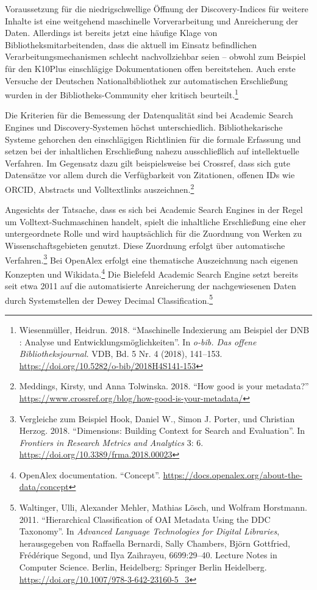 \documentclass[a4paper,
fontsize=11pt,
oneside,
numbers=noperiodatend,
parskip=half-,
bibliography=totoc,
final
]{scrartcl}
\begin{document}
Voraussetzung für die niedrigschwellige Öffnung der Discovery-Indices
für weitere Inhalte ist eine weitgehend maschinelle Vorverarbeitung und
Anreicherung der Daten. Allerdings ist bereits jetzt eine häufige Klage
von Bibliotheksmitarbeitenden, dass die aktuell im Einsatz befindlichen
Verarbeitungsmechanismen schlecht nachvollziehbar seien -- obwohl zum
Beispiel für den K10Plus einschlägige Dokumentationen offen
bereitstehen. Auch erste Versuche der Deutschen Nationalbibliothek zur
automatischen Erschließung wurden in der Bibliotheks-Community eher
kritisch beurteilt.\footnote{Wiesenmüller, Heidrun. 2018.
  \enquote{Maschinelle Indexierung am Beispiel der DNB : Analyse und
  Entwicklungsmöglichkeiten}. In \emph{o-bib. Das offene
  Bibliotheksjournal.} VDB, Bd. 5 Nr. 4 (2018), 141--153.
  \url{https://doi.org/10.5282/o-bib/2018H4S141-153}}

Die Kriterien für die Bemessung der Datenqualität sind bei Academic
Search Engines und Disco\-very-Systemen höchst unterschiedlich.
Bibliothekarische Systeme gehorchen den einschlägigen Richtlinien für
die formale Erfassung und setzen bei der inhaltlichen Erschließung
nahezu ausschließlich auf intellektuelle Verfahren. Im Gegensatz dazu
gilt beispielsweise bei Crossref, dass sich gute Datensätze vor allem
durch die Verfügbarkeit von Zitationen, offenen IDs wie ORCID, Abstracts
und Volltextlinks auszeichnen.\footnote{Meddings, Kirsty, und Anna
  Tolwinska. 2018. \enquote{How good is your metadata?}
  \url{https://www.crossref.org/blog/how-good-is-your-metadata/}}

Angesichts der Tatsache, dass es sich bei Academic Search Engines in der
Regel um Volltext-Suchmaschinen handelt, spielt die inhaltliche
Erschließung eine eher untergeordnete Rolle und wird hauptsächlich für
die Zuordnung von Werken zu Wissenschaftsgebieten genutzt. Diese
Zuordnung erfolgt über automatische Verfahren.\footnote{Vergleiche zum
  Beispiel Hook, Daniel W., Simon J. Porter, und Christian Herzog. 2018.
  \enquote{Dimensions: Building Context for Search and Evaluation}. In
  \emph{Frontiers in Research Metrics and Analytics} 3: 6.
  \url{https://doi.org/10.3389/frma.2018.00023}} Bei OpenAlex erfolgt
eine thematische Auszeichnung nach eigenen Konzepten und
Wikidata.\footnote{OpenAlex documentation. \enquote{Concept}.
  \url{https://docs.openalex.org/about-the-data/concept}} Die Bielefeld
Academic Search Engine setzt bereits seit etwa 2011 auf die
automatisierte Anreicherung der nachgewiesenen Daten durch Systemstellen
der Dewey Decimal Classification.\footnote{Waltinger, Ulli, Alexander
  Mehler, Mathias Lösch, und Wolfram Horstmann. 2011.
  \enquote{Hierarchical Classification of OAI Metadata Using the DDC
  Taxonomy}. In \emph{Advanced Language Technologies for Digital
  Libraries}, herausgegeben von Raffaella Bernardi, Sally Chambers,
  Björn Gottfried, Frédérique Segond, und Ilya Zaihrayeu, 6699:29--40.
  Lecture Notes in Computer Science. Berlin, Heidelberg: Springer Berlin
  Heidelberg. \url{https://doi.org/10.1007/978-3-642-23160-5_3}}
\end{document}
